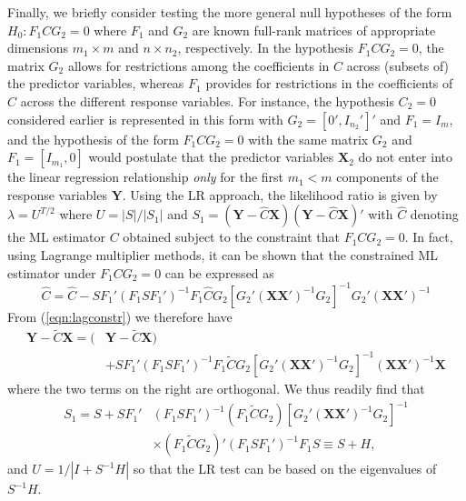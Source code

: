 Finally, we briefly consider testing the more general null hypotheses of the form $H_0: F_1CG_2=0$ where $F_1$ and $G_2$ are known full-rank matrices of appropriate dimensions $m_1 \times m$ and $n \times n_2$, respectively. In the hypothesis $F_1CG_2=0$, the matrix $G_2$ allows for restrictions among the coefficients in $C$ across (subsets of) the predictor variables, whereas $F_1$ provides for restrictions in the coefficients of $C$ across the different response variables. For instance, the hypothesis $C_2=0$ considered earlier is represented in this form with $G_2=[0',I_{n_2}']'$ and $F_1=I_m$, and the hypothesis of the form $F_1CG_2=0$ with the same matrix $G_2$ and $F_1=[I_{m_1},0]$ would postulate that the predictor variables $\mathbf{X}_2$ do not enter into the linear regression relationship \emph{only} for the first $m_1<m$ components of the response variables $\mathbf{Y}$. Using the LR approach, the likelihood ratio is given by $\lambda=U^{T/2}$ where $U=|S|/|S_1|$ and $S_1=(\mathbf{Y}-\hat{C}\mathbf{X})(\mathbf{Y}-\hat{C}\mathbf{X})'$ with $\hat{C}$ denoting the ML estimator $C$ obtained subject to the constraint that $F_1CG_2=0$. In fact, using Lagrange multiplier methods, it can be shown that the constrained ML estimator under $F_1CG_2=0$ can be expressed as
	\begin{equation}\label{eqn:lagconstr}
	\hat{C}=\hat{C}-SF_1'(F_1SF_1')^{-1} F_1\hat{C}G_2[G_2'(\mathbf{X}\mathbf{X}')^{-1}G_2]^{-1} G_2'(\mathbf{X}\mathbf{X}')^{-1}
	\end{equation}
From (\ref{eqn:lagconstr}) we therefore have
	\begin{equation}\label{eqn:boldys}
	\begin{split}
	\mathbf{Y}-\tilde{C}\mathbf{X}=(&\mathbf{Y}-\tilde{C}\mathbf{X}) \\
	&+SF_1'(F_1SF_1')^{-1}F_1\tilde{C}G_2[G_2'(\mathbf{X}\mathbf{X}')^{-1}G_2]^{-1}(\mathbf{X}\mathbf{X}')^{-1}\mathbf{X}
	\end{split}
	\end{equation}
where the two terms on the right are orthogonal. We thus readily find that
	\begin{equation}\label{eqn:lastdouble5}
	\begin{split}
	S_1=S+SF_1'&(F_1SF_1')^{-1}(F_1\tilde{C}G_2)[G_2'(\mathbf{X}\mathbf{X}')^{-1}G_2]^{-1} \\
	&\times (F_1\tilde{C}G_2)'(F_1SF_1')^{-1}F_1S \equiv S+H,
	\end{split}
	\end{equation}
and $U=1/|I+S^{-1}H|$ so that the LR test can be based on the eigenvalues of $S^{-1}H$.


